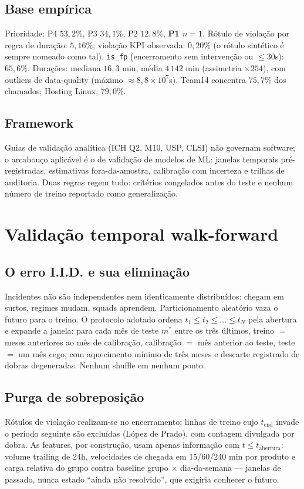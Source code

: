 \documentclass[11pt,a4paper]{article}
\begin{document}
\subsection{Base empírica}
Prioridade: P4 $53{,}2\%$, P3 $34{,}1\%$, P2 $12{,}8\%$, \textbf{P1 $n=1$}.
Rótulo de violação por regra de duração: $5{,}16\%$; violação KPI observada:
$0{,}20\%$ (o rótulo sintético é sempre nomeado como tal).
\texttt{is\_fp} (encerramento sem intervenção ou $\le 30$s): $65{,}6\%$.
Durações: mediana $16{,}3$ min, média $4\,142$ min (assimetria $\times 254$),
com outliers de data-quality (máximo $\approx 8{,}8\times10^7$s). Team14
concentra $75{,}7\%$ dos chamados; Hosting Linux, $79{,}0\%$.

\subsection{Framework}
Guias de validação analítica (ICH Q2, M10, USP, CLSI) não governam software;
o arcabouço aplicável é o de validação de modelos de ML: janelas temporais
pré-registradas, estimativas fora-da-amostra, calibração com incerteza e
trilhas de auditoria. Duas regras regem tudo: critérios congelados antes do
teste e nenhum número de treino reportado como generalização.

\section{Validação temporal walk-forward}

\subsection{O erro I.I.D. e sua eliminação}
Incidentes não são independentes nem identicamente distribuídos: chegam em
surtos, regimes mudam, squads aprendem. Particionamento aleatório vaza o
futuro para o treino. O protocolo adotado ordena $t_1\le t_2\le\dots\le t_N$
pela abertura e expande a janela: para cada mês de teste $m^*$ entre os três
últimos, treino $=$ meses anteriores ao mês de calibração, calibração $=$ mês
anterior ao teste, teste $=$ um mês cego, com aquecimento mínimo de três meses
e descarte registrado de dobras degeneradas. Nenhum shuffle em nenhum ponto.

\subsection{Purga de sobreposição}
Rótulos de violação realizam-se no encerramento; linhas de treino cujo
$t_{\text{end}}$ invade o período seguinte são excluídas (López de Prado),
com contagem divulgada por dobra. As features, por construção, usam apenas
informação com $t\le t_{\text{abertura}}$: volume trailing de 24h, velocidades
de chegada em 15/60/240 min por produto e carga relativa do grupo contra
baseline grupo $\times$ dia-da-semana --- janelas de passado, nunca estado
``ainda não resolvido'', que exigiria conhecer o futuro.
\end{document}
